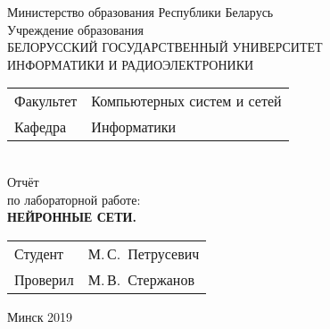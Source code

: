 \begin{titlepage}
  \begin{center}
    Министерство образования Республики Беларусь\\[1em]
    Учреждение образования\\
    БЕЛОРУССКИЙ ГОСУДАРСТВЕННЫЙ УНИВЕРСИТЕТ \\
    ИНФОРМАТИКИ И РАДИОЭЛЕКТРОНИКИ\\[1em]

    \begin{minipage}{\textwidth}
      \begin{flushleft}
        \begin{tabular}{ l l }
          Факультет & Компьютерных систем и сетей\\
          Кафедра   & Информатики
        \end{tabular}
      \end{flushleft}
    \end{minipage}\\[1em]


    {Отчёт}\\
    {по лабораторной работе:}\\[1em]
    \textbf{\large \MakeUppercase{Нейронные сети.}}\\[1em]


    \vfill
    \begin{tabular}{ p{}p{} }
      Студент & М.\,С.~Петрусевич \\
      Проверил & М.\,В.~Стержанов \\
    \end{tabular}
    
    \vfill
    {\normalsize Минск 2019}
  \end{center}
\end{titlepage}
